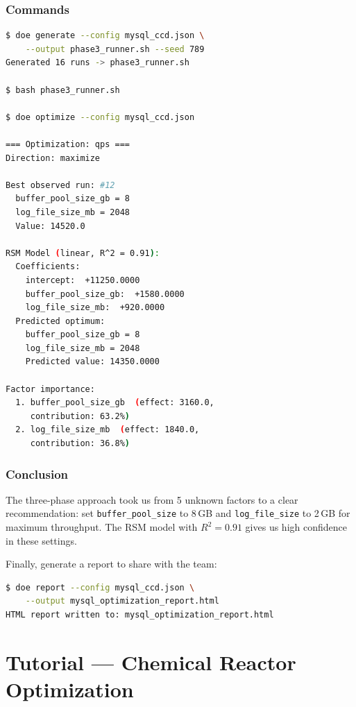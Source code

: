 \documentclass[11pt]{book}
\begin{document}
\subsection{Commands}

\begin{lstlisting}[language=bash]
$ doe generate --config mysql_ccd.json \
    --output phase3_runner.sh --seed 789
Generated 16 runs -> phase3_runner.sh

$ bash phase3_runner.sh

$ doe optimize --config mysql_ccd.json

=== Optimization: qps ===
Direction: maximize

Best observed run: #12
  buffer_pool_size_gb = 8
  log_file_size_mb = 2048
  Value: 14520.0

RSM Model (linear, R^2 = 0.91):
  Coefficients:
    intercept:  +11250.0000
    buffer_pool_size_gb:  +1580.0000
    log_file_size_mb:  +920.0000
  Predicted optimum:
    buffer_pool_size_gb = 8
    log_file_size_mb = 2048
    Predicted value: 14350.0000

Factor importance:
  1. buffer_pool_size_gb  (effect: 3160.0,
     contribution: 63.2%)
  2. log_file_size_mb  (effect: 1840.0,
     contribution: 36.8%)
\end{lstlisting}

\subsection{Conclusion}

The three-phase approach took us from 5 unknown factors to a clear recommendation: set \texttt{buffer\_pool\_size} to 8\,GB and \texttt{log\_file\_size} to 2\,GB for maximum throughput. The RSM model with $R^2 = 0.91$ gives us high confidence in these settings.

Finally, generate a report to share with the team:

\begin{lstlisting}[language=bash]
$ doe report --config mysql_ccd.json \
    --output mysql_optimization_report.html
HTML report written to: mysql_optimization_report.html
\end{lstlisting}


\chapter{Tutorial --- Chemical Reactor Optimization}
\label{ch:tutorial-reactor}
\end{document}
